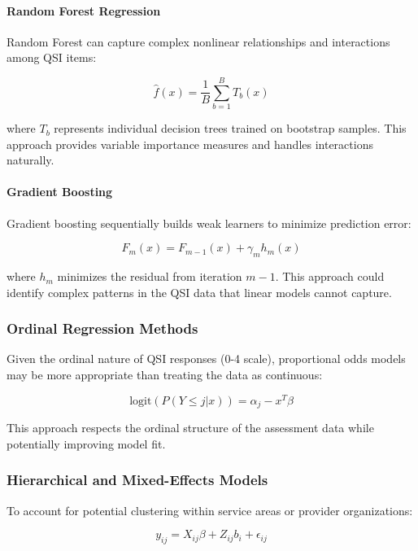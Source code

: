 \paragraph{Random Forest Regression}
Random Forest can capture complex nonlinear relationships and interactions among QSI items:

\begin{equation}
\hat{f}(x) = \frac{1}{B}\sum_{b=1}^B T_b(x)
\end{equation}

where $T_b$ represents individual decision trees trained on bootstrap samples. This approach provides variable importance measures and handles interactions naturally.

\paragraph{Gradient Boosting}
Gradient boosting sequentially builds weak learners to minimize prediction error:

\begin{equation}
F_m(x) = F_{m-1}(x) + \gamma_m h_m(x)
\end{equation}

where $h_m$ minimizes the residual from iteration $m-1$. This approach could identify complex patterns in the QSI data that linear models cannot capture.

\subsubsection{Ordinal Regression Methods}

Given the ordinal nature of QSI responses (0-4 scale), proportional odds models may be more appropriate than treating the data as continuous:

\begin{equation}
\text{logit}(P(Y \leq j|x)) = \alpha_j - x^T\beta
\end{equation}

This approach respects the ordinal structure of the assessment data while potentially improving model fit.

\subsubsection{Hierarchical and Mixed-Effects Models}

To account for potential clustering within service areas or provider organizations:

\begin{equation}
y_{ij} = X_{ij}\beta + Z_{ij}b_i + \epsilon_{ij}
\end{equation}

